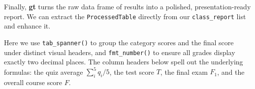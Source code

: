 \documentclass[
  letterpaper,
  DIV=11,
  numbers=noendperiod]{scrreprt}
\newenvironment{Shaded}{\begin{snugshade}}{\end{snugshade}}
\newcommand{\CommentTok}[1]{\textcolor[rgb]{0.37,0.37,0.37}{#1}}
\newcommand{\DecValTok}[1]{\textcolor[rgb]{0.68,0.00,0.00}{#1}}
\newcommand{\FunctionTok}[1]{\textcolor[rgb]{0.28,0.35,0.67}{#1}}
\newcommand{\NormalTok}[1]{\textcolor[rgb]{0.00,0.23,0.31}{#1}}
\newcommand{\OtherTok}[1]{\textcolor[rgb]{0.00,0.23,0.31}{#1}}
\newcommand{\SpecialCharTok}[1]{\textcolor[rgb]{0.37,0.37,0.37}{#1}}
\begin{document}
Finally, \textbf{gt} turns the raw data frame of results into a
polished, presentation-ready report. We can extract the
\texttt{ProcessedTable} directly from our \texttt{class\_report} list
and enhance it.

Here we use \texttt{tab\_spanner()} to group the category scores and the
final score under distinct visual headers, and \texttt{fmt\_number()} to
ensure all grades display exactly two decimal places. The column headers
below spell out the underlying formulas: the quiz average
\(\sum_{i}^5{q_i}/5\), the test score \(T\), the final exam \(F_1\), and
the overall course score \(F\).

\begin{Shaded}
\end{Shaded}
\end{document}
